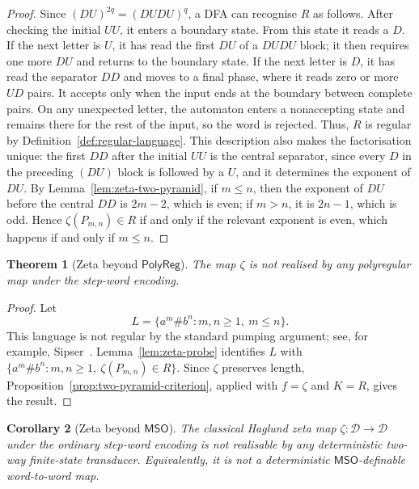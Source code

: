 \documentclass[11pt]{article}
\newtheorem{theorem}{Theorem}[section]
\newtheorem{corollary}[theorem]{Corollary}
\theoremstyle{definition}
\newcommand{\D}{\mathcal D}
\newcommand{\MSO}{\mathsf{MSO}}
\newcommand{\polyreg}{\mathsf{PolyReg}}
\begin{document}
\begin{proof}
Since $(DU)^{2q}=(DUDU)^q$, a DFA can recognise $R$ as follows.  After checking
the initial $UU$, it enters a boundary state.  From this state it reads a $D$.
If the next letter is $U$, it has read the first $DU$ of a $DUDU$ block; it
then requires one more $DU$ and returns to the boundary state.  If the next
letter is $D$, it has read the separator $DD$ and moves to a final phase, where
it reads zero or more $UD$ pairs.  It accepts only when the input ends at the
boundary between complete pairs.  On any unexpected letter, the automaton
enters a nonaccepting state and remains there for the rest of the input, so the
word is rejected.  Thus, $R$ is regular by
Definition~\ref{def:regular-language}.  This description also makes the
factorisation unique: the first $DD$ after the initial $UU$ is the central
separator, since every $D$ in the preceding $(DU)$ block is followed by a
$U$, and it determines the exponent of $DU$.  By
Lemma~\ref{lem:zeta-two-pyramid}, if $m\le n$, then the exponent of $DU$
before the central $DD$ is $2m-2$, which is even; if $m>n$, it is
$2n-1$, which is odd.  Hence $\zeta(P_{m,n})\in R$ if and only if the relevant
exponent is even, which happens if and only if $m\le n$.
\end{proof}

\begin{theorem}[Zeta beyond $\polyreg$]\label{thm:zeta-not-polyregular}
The map $\zeta$ is not realised by any polyregular map
under the step-word encoding.
\end{theorem}

\begin{proof}
Let
\[
   L=\{a^m\#b^n:m,n\ge 1,\ m\le n\}.
\]
This language is not regular by the standard pumping argument; see, for
example, Sipser~\cite[Chapter~1]{Sipser2013}.  Lemma~\ref{lem:zeta-probe}
identifies $L$ with
$\{a^m\#b^n:m,n\ge1,\ \zeta(P_{m,n})\in R\}$.  Since $\zeta$ preserves
length, Proposition~\ref{prop:two-pyramid-criterion}, applied with $f=\zeta$
and $K=R$, gives the result.
\end{proof}

\begin{corollary}[Zeta beyond $\MSO$]\label{cor:zeta-not-regular}
The classical Haglund zeta map $\zeta\colon\D\to\D$ under the ordinary
step-word encoding is not realisable by any deterministic two-way finite-state
transducer.  Equivalently, it is not a deterministic $\MSO$-definable
word-to-word map.
\end{corollary}
\end{document}
